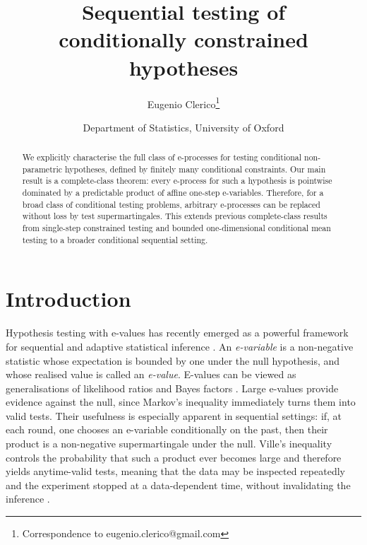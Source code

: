 \documentclass[10pt, a4paper]{article}
\author{Eugenio Clerico\footnote{Correspondence to eugenio.clerico@gmail.com}}
\date{\small Department of Statistics, University of Oxford}
\title{Sequential testing of\\ conditionally constrained hypotheses}
\begin{document}
\maketitle
\begin{abstract}
We  explicitly characterise the full class of e-processes for testing conditional non-parametric hypotheses, defined by finitely many conditional constraints. Our main result is a complete-class theorem: every e-process for such a hypothesis is pointwise dominated by a predictable product of affine one-step e-variables. Therefore, for a broad class of conditional testing problems, arbitrary e-processes can be replaced without loss by test supermartingales. This extends previous complete-class results from single-step constrained testing and bounded one-dimensional conditional mean testing to a broader conditional sequential setting.
\end{abstract}

\section{Introduction}\label{sec:intro}
Hypothesis testing with e-values has recently emerged as a powerful framework for sequential and adaptive statistical inference \citep{shafer2021testing,vovk2021evalues,grunwald2024safe,ramdas2023game,ramdas2024hypothesis}. An \emph{e-variable} is a non-negative statistic whose expectation is bounded by one under the null hypothesis, and whose realised value is called an \emph{e-value}. E-values can be viewed as generalisations of likelihood ratios and Bayes factors \citep{shafer2011test,wasserman2020universal}. Large e-values provide evidence against the null, since Markov's inequality immediately turns them into valid tests. Their usefulness is especially apparent in sequential settings: if, at each round, one chooses an e-variable conditionally on the past, then their product is a non-negative supermartingale under the null. Ville's inequality \citep{ville1939etude} controls the probability that such a product ever becomes large and therefore yields anytime-valid tests, meaning that the data may be inspected repeatedly and the experiment stopped at a data-dependent time, without invalidating the inference \citep{ramdas2024hypothesis}.
\end{document}
